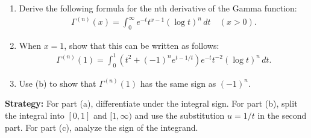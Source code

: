 \begin{problembox}
\begin{enumerate}[label=(\alph*)]
\item Derive the following formula for the nth derivative of the Gamma function:
\begin{align*}
\Gamma^{(n)}(x) = \int_{0}^{\infty} e^{-t} t^{x-1} (\log t)^{n} \, dt \quad (x > 0).
\end{align*}
\item When $x = 1$, show that this can be written as follows:
\begin{align*}
\Gamma^{(n)}(1) = \int_{0}^{1} (t^{2} + (-1)^{n} e^{t-1/t}) e^{-t} t^{-2} (\log t)^{n} \, dt.
\end{align*}
\item Use (b) to show that $\Gamma^{(n)}(1)$ has the same sign as $(-1)^{n}$.
\end{enumerate}
\end{problembox}

\noindent\textbf{Strategy:} For part (a), differentiate under the integral sign. For part (b), split the integral into $[0,1]$ and $[1,\infty)$ and use the substitution $u = 1/t$ in the second part. For part (c), analyze the sign of the integrand.


